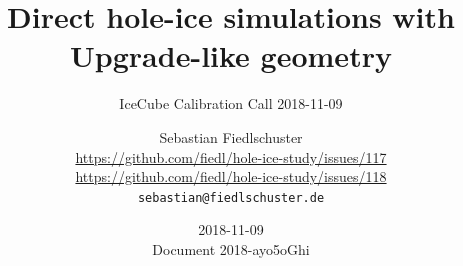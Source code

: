 \documentclass[green, 12pt]{beamer}
\title{Direct hole-ice simulations with Upgrade-like geometry}
\subtitle{IceCube Calibration Call 2018-11-09}
\date{2018-11-09 \\ \vspace*{2mm} \tiny{Document 2018-ayo5oGhi} \normalsize}
\author[Sebastian Fiedlschuster, ECAP Erlangen]{Sebastian Fiedlschuster \\ \tiny{\url{https://github.com/fiedl/hole-ice-study/issues/117} \\ \url{https://github.com/fiedl/hole-ice-study/issues/118}} \\ \tiny\texttt{sebastian@fiedlschuster.de}}
\institute{Erlangen Centre for Astroparticle Physics}
\newif\ifplacelogo %
\begin{document}



\placelogofalse



%   
%
%
%     
%
%     
%     
%     
%     
%     
%
%     
%
%     
%
%   
%
%
\end{document}
